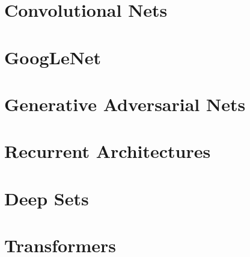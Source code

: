 \section{Convolutional Nets}

\section{GoogLeNet}

\section{Generative Adversarial Nets}

\section{Recurrent Architectures}

\section{Deep Sets}

\section{Transformers}